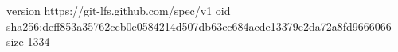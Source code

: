 version https://git-lfs.github.com/spec/v1
oid sha256:deff853a35762ccb0e0584214d507db63cc684acde13379e2da72a8fd9666066
size 1334
